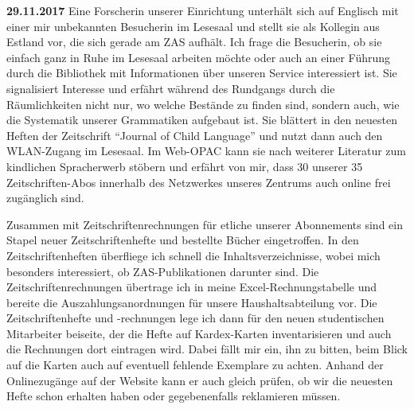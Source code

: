 \documentclass[a4paper,
fontsize=11pt,
oneside,
numbers=noperiodatend,
parskip=half-,
bibliography=totoc,
final
]{scrartcl}
\begin{document}
\textbf{29.11.2017} Eine Forscherin unserer Einrichtung unterhält sich
auf Englisch mit einer mir unbekannten Besucherin im Lesesaal und stellt
sie als Kollegin aus Estland vor, die sich gerade am ZAS aufhält. Ich
frage die Besucherin, ob sie einfach ganz in Ruhe im Lesesaal arbeiten
möchte oder auch an einer Führung durch die Bibliothek mit Informationen
über unseren Service interessiert ist. Sie signalisiert Interesse und
erfährt während des Rundgangs durch die Räumlichkeiten nicht nur, wo
welche Bestände zu finden sind, sondern auch, wie die Systematik unserer
Grammatiken aufgebaut ist. Sie blättert in den neuesten Heften der
Zeitschrift \enquote{Journal of Child Language} und nutzt dann auch den
WLAN-Zugang im Lesesaal. Im Web-OPAC kann sie nach weiterer Literatur
zum kindlichen Spracherwerb stöbern und erfährt von mir, dass 30 unserer
35 Zeitschriften-Abos innerhalb des Netzwerkes unseres Zentrums auch
online frei zugänglich sind.

Zusammen mit Zeitschriftenrechnungen für etliche unserer Abonnements
sind ein Stapel neuer Zeitschriftenhefte und bestellte Bücher
eingetroffen. In den Zeitschriftenheften überfliege ich schnell die
Inhaltsverzeichnisse, wobei mich besonders interessiert, ob
ZAS-Publikationen darunter sind. Die Zeitschriftenrechnungen übertrage
ich in meine Excel-Rechnungstabelle und bereite die
Auszahlungsanordnungen für unsere Haushaltsabteilung vor. Die
Zeitschriftenhefte und -rechnungen lege ich dann für den neuen
studentischen Mitarbeiter beiseite, der die Hefte auf Kardex-Karten
inventarisieren und auch die Rechnungen dort eintragen wird. Dabei fällt
mir ein, ihn zu bitten, beim Blick auf die Karten auch auf eventuell
fehlende Exemplare zu achten. Anhand der Onlinezugänge auf der Website
kann er auch gleich prüfen, ob wir die neuesten Hefte schon erhalten
haben oder gegebenenfalls reklamieren müssen.
\end{document}

